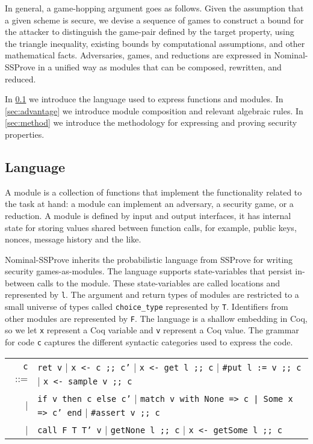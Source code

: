 \documentclass[a4paper,USenglish,cleveref, autoref]{lipics-v2021}
\newcommand{\M}[1]{\texttt{#1}}
\newcommand{\NSSP}{Nominal-SSProve\xspace}
\begin{document}
In general, a game-hopping argument goes as follows. Given the assumption that a given scheme is secure, we devise a sequence of games to construct a bound for the attacker to distinguish the game-pair defined by the target  property, using the triangle inequality, existing bounds by computational assumptions, and other mathematical facts.  Adversaries, games, and reductions are expressed in \NSSP in a unified way as modules that can be composed, rewritten, and reduced. 

In \cref{sec:lang} we introduce the language used to express functions and modules.
In \cref{sec:advantage} we introduce module composition and relevant algebraic rules.
In \cref{sec:method} we introduce the methodology for expressing and proving security properties.


\subsection{Language}\label{sec:lang}

A module is a collection of functions that implement the functionality related to the task at hand: a module can implement an adversary, a security game, or a reduction. A module is defined by input and output interfaces,  it has internal state for storing values shared between function calls, for example, public keys, nonces, message history and the like.

\NSSP inherits the probabilistic language from SSProve for writing security games-as-modules.
The language supports state-variables that persist in-between calls to the module. These
state-variables are called locations and represented by \M{l}.
The argument and return types of modules are restricted to a small universe of types called \texttt{choice\_type} represented by \M{T}.
Identifiers from other modules are represented by \M{F}.
The language is a shallow embedding in Coq, so we let \M{x} represent a Coq variable and \M{v} represent a Coq value.
The grammar for code \M{c} captures the different syntactic categories used to express the code. 
 
\bgroup
\setlength\tabcolsep{2pt}
\begin{center}
\begin{tabular}{rl}
  \M{c} ::=&\M{ret v}
  | \M{x <- c ;; c'}
  | \M{x <- get l ;; c}
  | \texttt{\#}\M{put l := v ;; c}
  | \M{x <- sample v ;; c} \\
  |&\M{if v then c else c'}
  | \M{match v with None => c | Some x => c' end}
  | \texttt{\#}\M{assert v ;; c} \\
  |&\M{call F T T' v}
  | \M{getNone l ;; c}
  | \M{x <- getSome l ;; c}
\end{tabular}
\end{center}
\egroup
\end{document}
